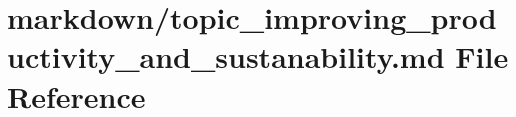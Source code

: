 \hypertarget{topic__improving__productivity__and__sustanability_8md}{}\section{markdown/topic\+\_\+improving\+\_\+productivity\+\_\+and\+\_\+sustanability.md File Reference}
\label{topic__improving__productivity__and__sustanability_8md}
